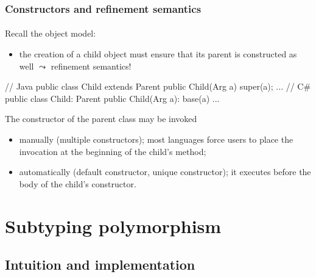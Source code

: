 \documentclass{beamer}
\begin{document}
\begin{frame}[fragile]
\frametitle{Constructors and refinement semantics}
\framesubtitle{}
Recall the object model: 
\begin{itemize}
\item
the creation of a child object must ensure that its parent is
constructed as well $\leadsto$ refinement semantics!
\end{itemize}

\begin{cplus3}
// Java 
public class Child extends Parent {
   public Child(Arg a) { super(a); ... }
} 
// C#
public class Child: Parent {
   public Child(Arg a): base(a) {...}
}
\end{cplus3}

The constructor of the parent class may be invoked 
\begin{itemize}
\item manually  (multiple constructors); most languages force
users to place the invocation at the beginning
of the child's method;
\item automatically (default constructor, unique constructor);
it executes before the body of the child's constructor.

\end{itemize}


\end{frame}

\section{Subtyping polymorphism}

\subsection{Intuition and implementation}
\end{document}
